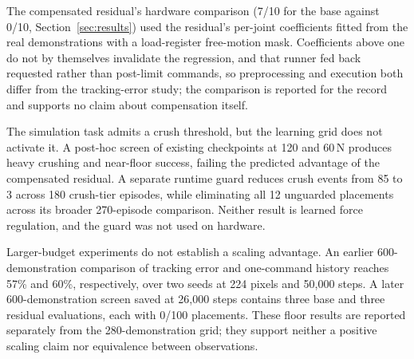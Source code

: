 \documentclass{article}
\begin{document}
\begin{table}[h]
\centering
\caption{Simulation design contrasts in placement-success points, with Welch
95\% intervals, unadjusted and Holm-adjusted $p$ values across all 28 pairs,
the retrospective resolution heuristic $15\sqrt{3/n}$ for the smaller seed count,
and whether the difference clears it.}
\label{tab:contrasts}
\resizebox{\linewidth}{!}{}
\end{table}

The compensated residual's hardware comparison (7/10 for the base against
0/10, Section~\ref{sec:results}) used the residual's per-joint coefficients fitted from the
real demonstrations with a load-register free-motion mask. Coefficients above
one do not by themselves invalidate the regression, and that runner fed back
requested rather than post-limit commands, so preprocessing and execution both
differ from the tracking-error study; the comparison is reported for the
record and supports no claim about compensation itself.

The simulation task admits a crush threshold, but the learning grid does not
activate it. A post-hoc screen of existing checkpoints at 120 and 60\,N
produces heavy crushing and near-floor success, failing the predicted
advantage of the compensated residual. A separate runtime guard reduces crush
events from 85 to 3 across 180 crush-tier episodes, while eliminating all
12 unguarded placements across its broader 270-episode comparison. Neither
result is learned force regulation, and the guard was not used on hardware.

Larger-budget experiments do not establish a scaling advantage. An earlier
600-demonstration comparison of tracking error and one-command history
reaches 57\% and 60\%, respectively, over two seeds at 224 pixels and 50,000
steps. A later 600-demonstration screen saved at 26,000 steps contains three
base and three residual evaluations, each with 0/100 placements. These
floor results are reported separately from the 280-demonstration grid; they
support neither a positive scaling claim nor equivalence between
observations.
\end{document}
